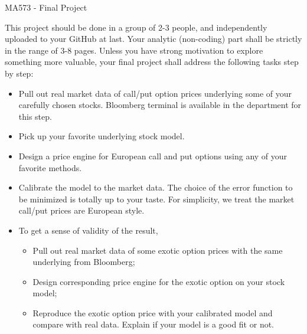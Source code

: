 \documentclass{article}
\begin{document}
\begin{center}
 MA573 - Final Project
\end{center}

This project should be done in a group of 2-3 people, and 
independently uploaded to your GitHub at last.
Your analytic (non-coding) part shall be strictly in the range of 3-8 pages. Unless you have strong motivation to explore something more valuable, your final project 
shall address the following tasks step by step: 
	

\begin{itemize}
\item Pull out real market data of call/put option prices 
underlying some of your carefully chosen stocks. Bloomberg terminal is 
available in the department for this step.
\item Pick up your favorite underlying stock model.
\item Design a price engine for European call and put options using 
any of your favorite methods. 
\item Calibrate the model to the 
market data. 
The choice of the error function to be minimized is totally up to your taste.
For simplicity, we treat the market call/put prices are European style.

\item 
To get a sense of validity of the result, 
\begin{itemize}
 \item Pull out real market data of some exotic option prices with the same underlying from Bloomberg;
 \item Design corresponding price engine for the exotic option on your stock model;
 \item Reproduce the exotic option price with your calibrated model and compare with real data. Explain if your model is a good fit or not.
\end{itemize}
\end{itemize}
\end{document}
